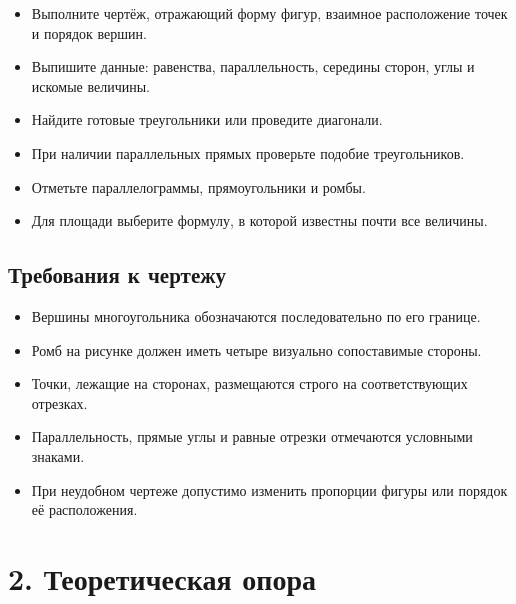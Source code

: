 \documentclass[a4paper,12pt]{article}
\begin{document}
\begin{itemize}
    \item Выполните чертёж, отражающий форму фигур, взаимное расположение точек и порядок вершин.
    \item Выпишите данные: равенства, параллельность, середины сторон, углы и искомые величины.
    \item Найдите готовые треугольники или проведите диагонали.
    \item При наличии параллельных прямых проверьте подобие треугольников.
    \item Отметьте параллелограммы, прямоугольники и ромбы.
    \item Для площади выберите формулу, в которой известны почти все величины.
\end{itemize}

\subsection*{\color{darkaccent}Требования к чертежу}

\begin{itemize}
    \item Вершины многоугольника обозначаются последовательно по его границе.
    \item Ромб на рисунке должен иметь четыре визуально сопоставимые стороны.
    \item Точки, лежащие на сторонах, размещаются строго на соответствующих отрезках.
    \item Параллельность, прямые углы и равные отрезки отмечаются условными знаками.
    \item При неудобном чертеже допустимо изменить пропорции фигуры или порядок её расположения.
\end{itemize}

\section*{\color{darkaccent}2. Теоретическая опора}
\end{document}
